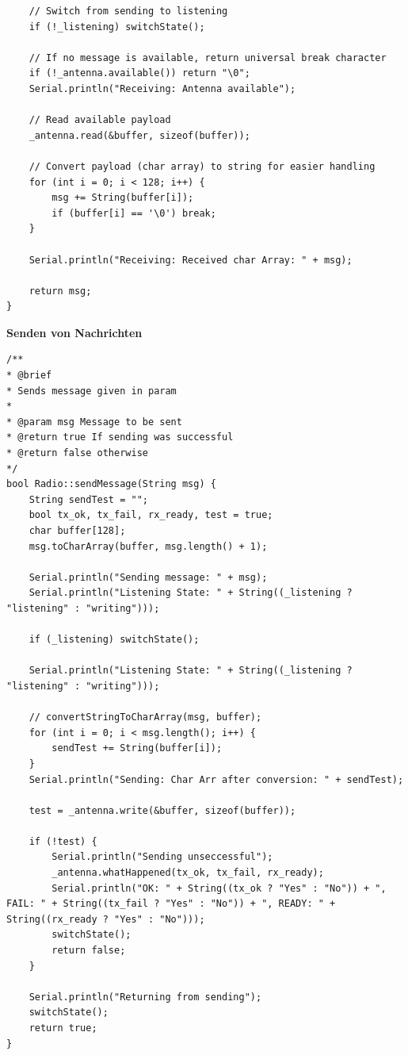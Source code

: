 \documentclass[a4paper, 11pt]{scrartcl}
\begin{document}
\begin{small}
\begin{lstlisting}
    // Switch from sending to listening
    if (!_listening) switchState();

    // If no message is available, return universal break character
    if (!_antenna.available()) return "\0";
    Serial.println("Receiving: Antenna available");

    // Read available payload
    _antenna.read(&buffer, sizeof(buffer));

    // Convert payload (char array) to string for easier handling
    for (int i = 0; i < 128; i++) {
        msg += String(buffer[i]);
        if (buffer[i] == '\0') break;
    }

    Serial.println("Receiving: Received char Array: " + msg);

    return msg;
}
\end{lstlisting}

\begin{flushleft}\textbf{Senden von Nachrichten}\label{code:sending}\end{flushleft}
\begin{lstlisting}
/**
* @brief 
* Sends message given in param
* 
* @param msg Message to be sent
* @return true If sending was successful
* @return false otherwise
*/
bool Radio::sendMessage(String msg) {
    String sendTest = "";
    bool tx_ok, tx_fail, rx_ready, test = true;
    char buffer[128];
    msg.toCharArray(buffer, msg.length() + 1);
    
    Serial.println("Sending message: " + msg);
    Serial.println("Listening State: " + String((_listening ? "listening" : "writing")));

    if (_listening) switchState();
    
    Serial.println("Listening State: " + String((_listening ? "listening" : "writing")));

    // convertStringToCharArray(msg, buffer);
    for (int i = 0; i < msg.length(); i++) {
        sendTest += String(buffer[i]);
    }
    Serial.println("Sending: Char Arr after conversion: " + sendTest);
    
    test = _antenna.write(&buffer, sizeof(buffer));

    if (!test) {
        Serial.println("Sending unseccessful");
        _antenna.whatHappened(tx_ok, tx_fail, rx_ready);
        Serial.println("OK: " + String((tx_ok ? "Yes" : "No")) + ", FAIL: " + String((tx_fail ? "Yes" : "No")) + ", READY: " + String((rx_ready ? "Yes" : "No")));
        switchState();
        return false;
    }

    Serial.println("Returning from sending");
    switchState();
    return true;
}
\end{lstlisting}


\end{small}
\end{document}
